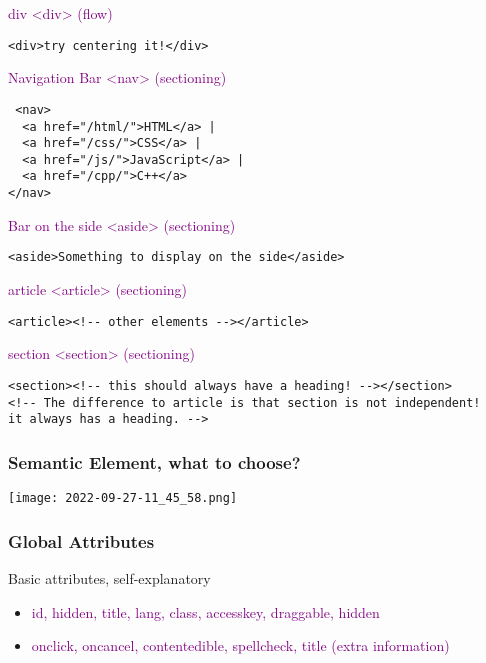 \documentclass[main.tex,fontsize=6pt,paper=a4,paper=landscape,DIV=calc,]{scrartcl}
\begin{document}
\begin{multicols*}{4}
\textcolor{purple}{div <div> (flow)}
\vspace{-2mm}
\begin{lstlisting}
<div>try centering it!</div>
\end{lstlisting}
\vspace{2mm}

\textcolor{purple}{Navigation Bar <nav> (sectioning)}
\vspace{-2mm}
\begin{lstlisting}
 <nav>
  <a href="/html/">HTML</a> |
  <a href="/css/">CSS</a> |
  <a href="/js/">JavaScript</a> |
  <a href="/cpp/">C++</a>
</nav>
\end{lstlisting}
\vspace{2mm}

\textcolor{purple}{Bar on the side <aside> (sectioning)}
\vspace{-2mm}
\begin{lstlisting}
<aside>Something to display on the side</aside>
\end{lstlisting}
\vspace{2mm}

\textcolor{purple}{article <article> (sectioning)}
\vspace{-2mm}
\begin{lstlisting}
<article><!-- other elements --></article>
\end{lstlisting}
\vspace{2mm}

\textcolor{purple}{section <section> (sectioning)}
\vspace{-2mm}
\begin{lstlisting}
<section><!-- this should always have a heading! --></section>
<!-- The difference to article is that section is not independent! 
it always has a heading. -->
\end{lstlisting}
\vspace{2mm}

\subsubsection{Semantic Element, what to choose?}
\texttt{[image: 2022-09-27-11\_45\_58.png]}

\subsubsection{Global Attributes}
Basic attributes, self-explanatory
\begin{itemize}
\item \textcolor{purple}{id, hidden, title, lang, class, accesskey, draggable, hidden}
\item \textcolor{purple}{onclick, oncancel, contentedible, spellcheck, title (extra information)}
\end{itemize} 


\end{multicols*}
\end{document}
